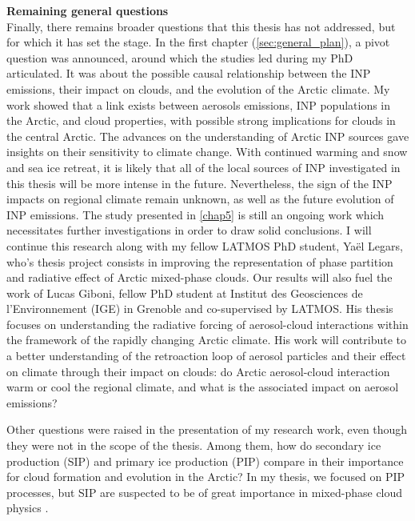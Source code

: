 \noindent
\textbf{Remaining general questions}\\
Finally, there remains broader questions that this thesis has not addressed, but for which it has set the stage.
In the first chapter (\cref{sec:general_plan}), a pivot question was announced, around which the studies led during my PhD articulated.
It was about the possible causal relationship between the INP emissions, their impact on clouds, and the evolution of the Arctic climate.  %
My work showed that a link exists between aerosols emissions, INP populations in the Arctic, and cloud properties, with possible strong implications for clouds in the central Arctic. 
The advances on the understanding of Arctic INP sources gave insights on their sensitivity to climate change. With continued warming and snow and sea ice retreat, it is likely that all of the local sources of INP investigated in this thesis will be more intense in the future.
Nevertheless, the sign of the INP impacts on regional climate remain unknown, as well as the future evolution of INP emissions.
The study presented in \cref{chap5} is still an ongoing work which necessitates further investigations in order to draw solid conclusions.
I will continue this research along with my fellow LATMOS PhD student, Yaël Legars, who's thesis project consists in improving the representation of phase partition and radiative effect of Arctic mixed-phase clouds.
Our results will also fuel the work of Lucas Giboni, fellow PhD student at Institut des Geosciences de l'Environnement (IGE) in Grenoble and co-supervised by LATMOS.
His thesis focuses on understanding the radiative forcing of aerosol-cloud interactions within the framework of the rapidly changing Arctic climate.
His work will contribute to a better understanding of the retroaction loop of aerosol particles and their effect on climate through their impact on clouds: do Arctic aerosol-cloud interaction warm or cool the regional climate, and what is the associated impact on aerosol emissions?
\vspace{\baselineskip}

Other questions were raised in the presentation of my research work, even though they were not in the scope of the thesis.
Among them, how do secondary ice production (SIP) and primary ice production (PIP) compare in their importance for cloud formation and evolution in the Arctic?
In my thesis, we focused on PIP processes, but SIP are suspected to be of great importance in mixed-phase cloud physics \citep{sotiropoulou_impact_2020, zhao_global_2021, zhao_primary_2022}.

